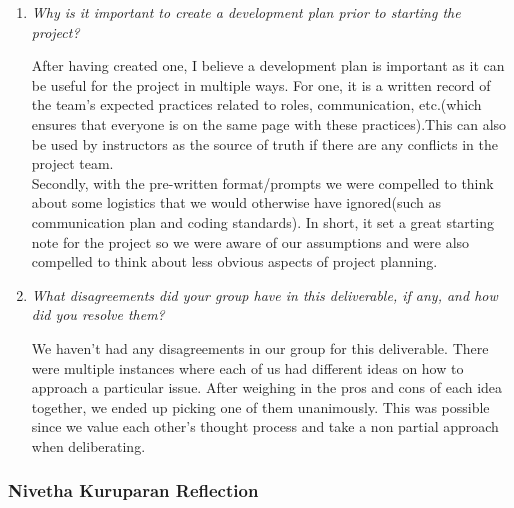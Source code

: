 \documentclass{article}
\begin{document}
\begin{enumerate}
  \item \textit{Why is it important to create a development plan prior to starting the project?}

   After having created one, I believe a development plan is important as it can be useful for the project in multiple ways. For one, it is a written record of the team's expected practices related to roles, communication, etc.(which ensures that everyone is on the same page with these practices).This can also be used by instructors as the source of truth if there are any conflicts in the project team.\\

   Secondly, with the pre-written format/prompts we were compelled to think about some logistics that we would otherwise have ignored(such as communication plan and coding standards). In short, it set a great starting note for the project so we were aware of our assumptions and were also compelled to think about less obvious aspects of project planning.

  \item \textit{What disagreements did your group have in this deliverable, if any, and how did you resolve them?}

  We haven’t had any disagreements in our group for this deliverable. There were multiple instances where each of us had different ideas on how to approach a particular issue. After weighing in the pros and cons of each idea together, we ended up picking one of them unanimously. This was possible since we value each other’s thought process and take a non partial approach when deliberating.

\end{enumerate}

\subsubsection*{Nivetha Kuruparan Reflection}
\end{document}
